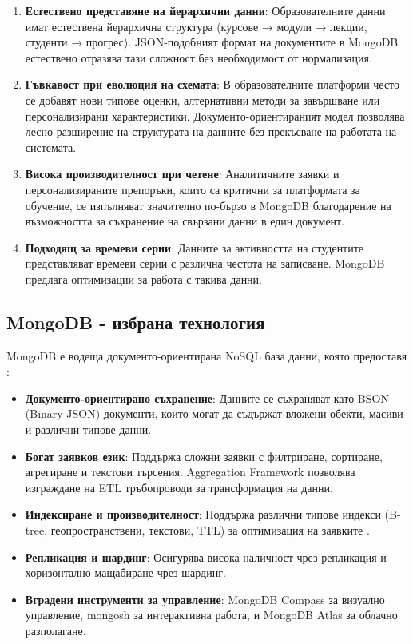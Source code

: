 \begin{enumerate}
    \item \textbf{Естествено представяне на йерархични данни}: Образователните данни имат естествена йерархична структура (курсове → модули → лекции, студенти → прогрес). JSON-подобният формат на документите в MongoDB естествено отразява тази сложност без необходимост от нормализация.

    \item \textbf{Гъвкавост при еволюция на схемата}: В образователните платформи често се добавят нови типове оценки, алтернативни методи за завършване или персонализирани характеристики. Документо-ориентираният модел позволява лесно разширение на структурата на данните без прекъсване на работата на системата.

    \item \textbf{Висока производителност при четене}: Аналитичните заявки и персонализираните препоръки, които са критични за платформата за обучение, се изпълняват значително по-бързо в MongoDB благодарение на възможността за съхранение на свързани данни в един документ.

    \item \textbf{Подходящ за времеви серии}: Данните за активността на студентите представляват времеви серии с различна честота на записване. MongoDB предлага оптимизации за работа с такива данни.
\end{enumerate}

\subsection{MongoDB - избрана технология}

MongoDB е водеща документо-ориентирана NoSQL база данни, която предоставя \cite{mongodb_manual}:

\begin{itemize}
    \item \textbf{Документо-ориентирано съхранение}: Данните се съхраняват като BSON (Binary JSON) документи, които могат да съдържат вложени обекти, масиви и различни типове данни.

    \item \textbf{Богат заявков език}: Поддържа сложни заявки с филтриране, сортиране, агрегиране и текстови търсения. Aggregation Framework позволява изграждане на ETL тръбопроводи за трансформация на данни.

    \item \textbf{Индексиране и производителност}: Поддържа различни типове индекси (B-tree, геопространствени, текстови, TTL) за оптимизация на заявките \cite{mongodb_indexing}.

    \item \textbf{Репликация и шардинг}: Осигурява висока наличност чрез репликация и хоризонтално мащабиране чрез шардинг.

    \item \textbf{Вградени инструменти за управление}: MongoDB Compass за визуално управление, mongosh за интерактивна работа, и MongoDB Atlas за облачно разполагане.
\end{itemize}

